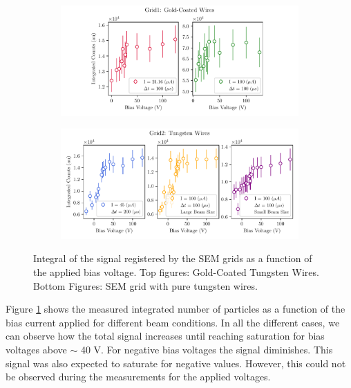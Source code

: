 \begin{figure}[t]
    \centering
    \begin{subfigure}{1.0\columnwidth}
        \centering
        \includegraphics[width=\columnwidth]{IntensityScan/Grid1_IntensityScan.pdf}
    \end{subfigure}
    \begin{subfigure}{1.0\columnwidth}
        \centering
        \includegraphics[width=\columnwidth]{IntensityScan/Grid2_IntensityScan.pdf}
    \end{subfigure}
    
    \caption{Integral of the signal registered by the SEM grids as a function of the applied bias voltage. Top figures: Gold-Coated Tungsten Wires. Bottom Figures: SEM grid with pure tungsten wires. }
    \label{fig:BiasScan}
\end{figure}

Figure \ref{fig:BiasScan} shows the measured integrated number of particles as a function of the bias current applied for different beam conditions. In all the different cases, we can observe how the total signal increases until reaching saturation for bias voltages above $\sim$ 40 V. For negative bias voltages the signal diminishes. This signal was also expected to saturate for negative values. However, this could not be observed during the measurements for the applied voltages. 

